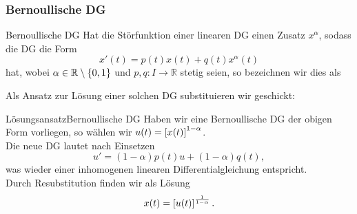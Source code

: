 \subsubsection{Bernoullische DG}
\begin{Def}
{Bernoullische DG}
Hat die Störfunktion einer linearen DG einen Zusatz $x^\alpha$, sodass die DG die Form
\begin{equation*}
    x'(t)=p(t)x(t)+q(t)x^\alpha(t)
\end{equation*}
hat, wobei $\alpha\in\mathbb{R}\setminus\left\{0,1\right\}$ und $p,q:I\to\mathbb{R}$ stetig seien, so bezeichnen wir dies als 
\end{Def}
Als Ansatz zur Lösung einer solchen DG substituieren wir geschickt:
\begin{Satz}
{Lösungsansatz}{Bernoullische DG}
Haben wir eine Bernoullische DG der obigen Form vorliegen, so wählen wir $u(t)=\left[{x(t)}\right]^{1-\alpha}$.\\
Die neue DG lautet nach Einsetzen
\begin{equation*}
    u'=(1-\alpha)p(t)u+(1-\alpha)q(t),
\end{equation*}
was wieder einer inhomogenen linearen Differentialgleichung entspricht.\\
Durch Resubstitution finden wir als Lösung
\begin{equation*}
    x(t)=\left[{u(t)}\right]^\frac{1}{1-\alpha}.
\end{equation*}
\end{Satz}
